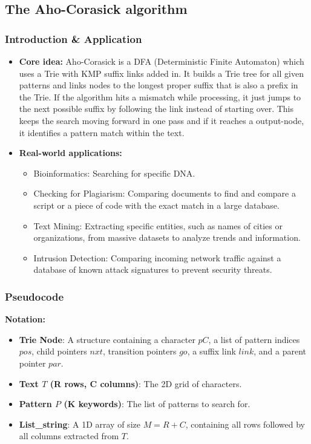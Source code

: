 \subsection[The Aho-Corasick algorithm]{The Aho-Corasick algorithm\cite{cpalgorithms_ahocorasick}}
    \subsubsection{Introduction \& Application}
        \begin{itemize}
            \item \textbf{Core idea:} Aho-Corasick is a DFA (Deterministic Finite Automaton) which uses a Trie with KMP suffix links added in.
            It builds a Trie tree for all given patterns and links nodes to the longest proper suffix that is also a prefix in the Trie. 
            If the algorithm hits a mismatch while processing, it just jumps to the next possible suffix by following the link instead of starting over. 
            This keeps the search moving forward in one pass and if it reaches a output-node, it identifies a pattern match within the text.
            \item \textbf{Real-world applications:}
            \begin{itemize}
                \item Bioinformatics: Searching for specific DNA.
                \item Checking for Plagiarism: Comparing documents to find and compare a script or a piece of code with the exact match in a large database.
                \item Text Mining: Extracting specific entities, such as names of cities or organizations, from massive datasets to analyze trends and information.
                \item Intrusion Detection: Comparing incoming network traffic against a database of known attack signatures to prevent security threats.
            \end{itemize}
        \end{itemize}

    \subsubsection{Pseudocode}
        \textbf{Notation:}
        \begin{itemize}
            \item \textbf{Trie Node}: A structure containing a character $pC$, a list of pattern indices $pos$, child pointers $nxt$, transition pointers $go$, a suffix link $link$, and a parent pointer $par$.
            \item \textbf{Text $T$ (R rows, C columns)}: The 2D grid of characters.
            \item \textbf{Pattern $P$ (K keywords)}: The list of patterns to search for.
            \item \textbf{List\_string}: A 1D array of size $M = R + C$, containing all rows followed by all columns extracted from $T$.
        \end{itemize}

